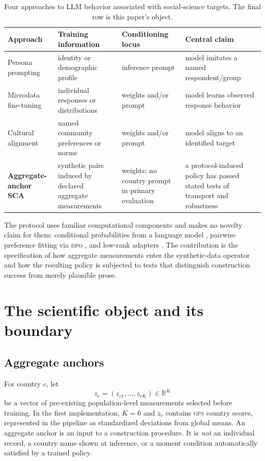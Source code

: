 \documentclass[10pt,letterpaper]{article}
\newcommand{\GPS}{\textsc{gps}}
\newcommand{\DPO}{\textsc{dpo}}
\begin{document}
\begin{table}[H]
\centering\small
\caption{Four approaches to LLM behavior associated with social-science targets. The final row is this paper's object.}\label{tab:positioning}
\begin{tabularx}{\textwidth}{@{}p{2.45cm}p{2.3cm}p{2cm}X@{}}
\toprule
\textbf{Approach} & \textbf{Training information} & \textbf{Conditioning locus} & \textbf{Central claim}\\
\midrule
Persona prompting & identity or demographic profile & inference prompt & model imitates a named respondent/group\\
Microdata fine-tuning & individual responses or distributions & weights and/or prompt & model learns observed response behavior\\
Cultural alignment & named community preferences or norms & weights and/or prompt & model aligns to an identified target\\
\textbf{Aggregate-anchor SCA} & synthetic pairs induced by declared aggregate measurements & weights; no country prompt in primary evaluation & a protocol-induced policy has passed stated tests of transport and robustness\\
\bottomrule
\end{tabularx}
\end{table}

The protocol uses familiar computational components and makes no novelty claim for them: conditional probabilities from a language model \cite{ludwig2026}, pairwise preference fitting via \DPO{} \cite{rafailov2023}, and low-rank adapters \cite{hu2022,dettmers2023}. The contribution is the specification of how aggregate measurements enter the synthetic-data operator and how the resulting policy is subjected to tests that distinguish construction success from merely plausible prose.

\section{The scientific object and its boundary}
\subsection{Aggregate anchors}
For country $c$, let
\begin{equation}
z_c=(z_{c1},\ldots,z_{cK})\in\mathbb{R}^K
\label{eq:anchor}
\end{equation}
be a vector of pre-existing population-level measurements selected before training. In the first implementation, $K=6$ and $z_c$ contains \GPS{} country scores, represented in the pipeline as standardized deviations from global means. An aggregate anchor is an input to a construction procedure. It is \emph{not} an individual record, a country name shown at inference, or a moment condition automatically satisfied by a trained policy.
\end{document}
